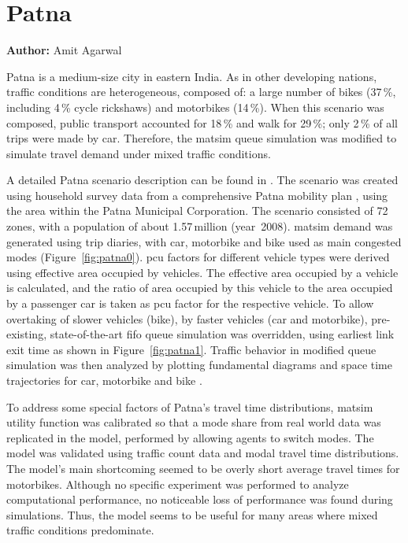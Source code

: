 \chapter{Patna}
\label{ch:patna}
\hfill \textbf{Author:} Amit Agarwal


Patna is a medium-size city in eastern India. As in other developing nations, traffic conditions are heterogeneous, composed of: a large number of bikes (37\,\%, including 4\,\% cycle rickshaws) and motorbikes (14\,\%). When this scenario was composed, public transport accounted for 18\,\% and walk for 29\,\%; only 2\,\% of all trips were made by car. Therefore, the \gls{matsim} queue simulation was modified to simulate travel demand under mixed traffic conditions.

A detailed Patna scenario description can be found in \citet[][]{AgarwalEtcMixedTraffic}. The scenario was created using household survey data from a comprehensive Patna mobility plan \citep[][]{TrippItransVks2009PatnaReport}, using the area within the Patna Municipal Corporation. The scenario consisted of 72\,zones, with a population of about 1.57\,million (year~2008). \gls{matsim} demand was generated using trip diaries, with car, motorbike and bike used as main congested modes (Figure~\ref{fig:patna0}). \gls{pcu} factors for different vehicle types were derived using effective area occupied by vehicles. The effective area occupied by a vehicle is calculated, and the ratio of area occupied by this vehicle to the area occupied by a passenger car is taken as \gls{pcu} factor for the respective vehicle.
To allow overtaking of slower vehicles (bike), by faster vehicles (car and motorbike), pre-existing, state-of-the-art \gls{fifo} queue simulation was overridden, using earliest link exit time as shown in Figure~\ref{fig:patna1}. Traffic behavior in modified queue simulation was then analyzed by plotting fundamental diagrams and space time trajectories for car, motorbike and bike \citep[][]{AgarwalEtc2015MixedTrafficABMTRANS}.

To address some special factors of Patna's travel time distributions, \gls{matsim} utility function was calibrated so that a mode share from real world data was replicated in the model, performed by allowing agents to switch modes. The model was validated using traffic count data and modal travel time distributions. The model's main shortcoming seemed to be overly short average travel times for motorbikes. Although no specific experiment was performed to analyze computational performance, no noticeable loss of performance was found during simulations. Thus, the model seems to be useful for many areas where mixed traffic conditions predominate.

